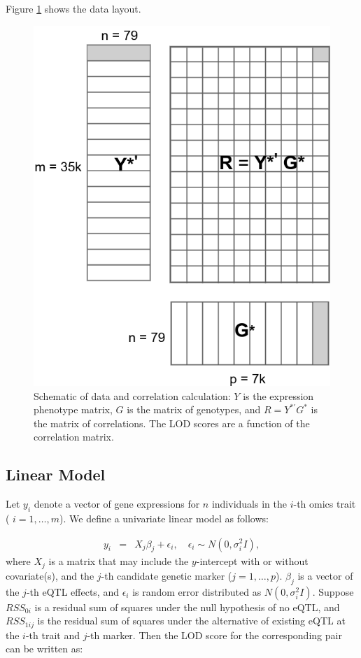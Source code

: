 \documentclass[9pt,twocolumn,twoside,lineno]{gsag3jnl}
\begin{document}
Figure \ref{MatrixMult} shows the data layout.
\begin{figure}[!htb]
	
	\caption{Schematic of data and correlation calculation: $Y$ is
		the expression phenotype matrix, $G$ is the matrix of
		genotypes, and $R=Y^{*\prime}G^{*}$ is the matrix of
		correlations.  The LOD scores are a function of the
		correlation matrix.}
	\label{MatrixMult}
	\includegraphics[scale = .4]{figs/YGmatrixStd.png}
\end{figure}    


\subsection{Linear Model} 
 Let $y_i$ denote a vector of gene expressions for $n$
individuals in the $i$-th omics trait ( $i=1,\ldots,m$).  We
define a univariate linear model as follows:

\begin{eqnarray*}
	y_i &=& X_j \beta_j+ \epsilon_i,
	\quad \epsilon_i \sim N(0,\sigma_i^2I),
\end{eqnarray*}
where ${X}_j$ is a matrix that may include the $y$-intercept with
or without covariate(s), and the $j$-th candidate genetic marker
($j=1,\ldots,p$).  ${\beta}_j$ is a vector of the $j$-th eQTL
effects, and ${\epsilon}_i$ is random error distributed as $N(0,\sigma_i^2I)$.  Suppose $RSS_{0i}$
is a residual sum of squares under the null hypothesis of no eQTL, and $RSS_{1ij}$ is the residual sum of squares under the
alternative of existing eQTL at the $i$-th trait and $j$-th marker.  Then the LOD
score for the corresponding pair can be written as:
\end{document}
